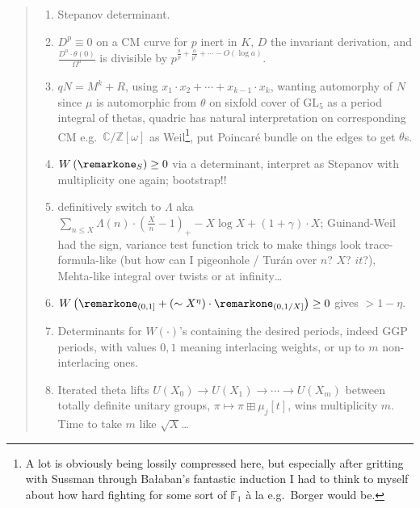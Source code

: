 \documentclass[11pt]{amsbook}
\theoremstyle{plain}
\theoremstyle{definition}
\theoremstyle{remark}
\numberwithin{equation}{section}
\numberwithin{figure}{chapter}
\numberwithin{table}{chapter}
\begin{document}
\begin{quotation}
\begin{enumerate}
\item {} Stepanov determinant.

\item {} $D^p \equiv 0$ on a CM curve for $p$ inert in
$K$, $D$ the invariant derivation, and
$\frac{D^a\cdot\theta(0)}{\Omega^a}$ is divisible by
$p^{\frac{a}{p}+\frac{a}{p^3}+\cdots-O(\log a)}$.

\item {} $qN = M^k + R$, using
$x_1\cdot x_2+\cdots+x_{k-1}\cdot x_k$, wanting
\remarkdq automorphy\remarkdq{} of $N$ since $\mu$ is automorphic from
$\theta$ on sixfold cover of $\mathrm{GL}_5$ as a period integral of thetas,
quadric has natural interpretation on corresponding CM e.g.\
$\mathbb{C}/\mathbb{Z}[\omega]$ as Weil\footnote{A lot is obviously being
lossily compressed here, but especially after gritting with Sussman through
Ba\l aban's fantastic induction I had to think to myself about how hard
fighting for some sort of $\mathbb{F}_1$ \`a la e.g.\ Borger would be.}, put
Poincar\'e bundle on the edges to get $\theta$s.

\item {} $W\left(\remarkone_S\right)\geq 0$ via a
determinant, interpret as Stepanov with multiplicity one again; bootstrap!!

\item {} definitively switch to $\Lambda$ aka
$\sum_{n\leq X}\Lambda(n)\cdot\left(\frac{X}{n}-1\right)_{+}-X\log X+
(1+\gamma)\cdot X$; Guinand-Weil had the sign, variance test function trick
to make things look trace-formula-like (but how can I pigeonhole / Tur\'an
over $n$? $X$? $it$?), Mehta-like integral over twists or at infinity\dots

\item {}
$W\left(\remarkone_{(0,1]}+(\sim X^{\eta})\cdot\remarkone_{(0,1/X]}\right)
\geq 0$ gives $>1-\eta$.

\item {} Determinants for $W(\cdot)$'s containing the
desired periods, indeed GGP periods, with values $0,1$ meaning interlacing
weights, or up to $m$ non-interlacing ones.

\item {} Iterated theta lifts
$U(X_0)\to U(X_1)\to\cdots\to U(X_m)$ between totally definite unitary
groups, $\pi\mapsto\pi\boxplus\mu_j[t]$, wins multiplicity $m$. Time to take
$m$ like $\sqrt{X}$\dots


\end{enumerate}
\end{quotation}
\end{document}

